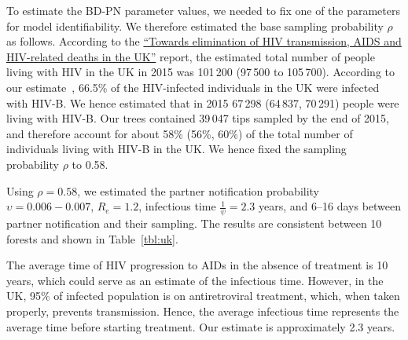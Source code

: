 \documentclass[a4paper,10pt]{article}
\begin{document}
To estimate the BD-PN parameter values, we needed to fix one of the parameters for model identifiability. We therefore estimated the base sampling probability $\rho$ as follows. According to the \href{https://webarchive.nationalarchives.gov.uk/ukgwa/20181112132123mp_/https://assets.publishing.service.gov.uk/government/uploads/system/uploads/attachment_data/file/602942/HIV_in_the_UK_report.pdf}{``Towards elimination of HIV transmission, AIDS and HIV-related deaths in the UK''}
 report, the estimated total number of people living with HIV in the UK in 2015 was 101\,200 (97\,500 to 105\,700). %
According to our estimate~\citep{zhukovaModelingDrugResistance2023}, 66.5\% of the HIV-infected individuals in the UK were infected with HIV-B. We hence estimated that in 2015 67\,298 (64\,837, 70\,291) people were living with HIV-B. Our trees contained 39\,047 tips sampled by the end of 2015, and therefore account for about 58\% (56\%, 60\%) of the total number of individuals living with HIV-B in the UK. We hence fixed the sampling probability $\rho$ to 0.58. %
 
 
Using $\rho=0.58$, we estimated the partner notification probability $\upsilon=0.006-0.007$, %
$R_e = 1.2$, infectious time $\frac{1}{\psi} = 2.3$ years, and 6--16 days between partner notification and their sampling. The results are consistent between 10 forests and shown in Table~\ref{tbl:uk}. %
 
The average time of HIV progression to AIDs in the absence of treatment is 10 years, which could serve as an estimate of the infectious time. However, in the UK, 95\% of infected population is on antiretroviral treatment, which, when taken properly, prevents transmission. Hence, the average infectious time represents the average time before starting treatment. Our estimate is approximately 2.3 years. 
\end{document}
